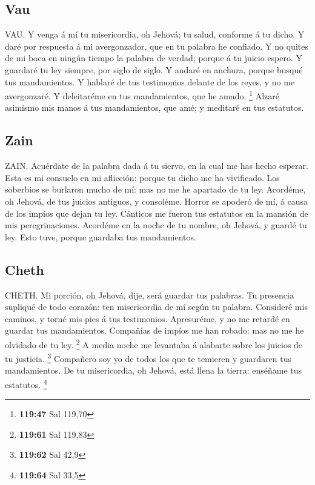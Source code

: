 \hypertarget{vau}{%
\subsection{Vau}\label{vau}}

 VAU. Y venga á mí tu misericordia, oh Jehová; tu salud,
conforme á tu dicho.  Y daré por respuesta á mi
avergonzador, que en tu palabra he confiado.  Y no quites
de mi boca en ningún tiempo la palabra de verdad; porque á tu juicio
espero.  Y guardaré tu ley siempre, por siglo de siglo.
 Y andaré en anchura, porque busqué tus mandamientos.
 Y hablaré de tus testimonios delante de los reyes, y no me
avergonzaré.  Y deleitaréme en tus mandamientos, que he
amado. \footnote{\textbf{119:47} Sal 119,70}  Alzaré
asimismo mis manos á tus mandamientos, que amé; y meditaré en tus
estatutos.

\hypertarget{zain}{%
\subsection{Zain}\label{zain}}

 ZAIN. Acuérdate de la palabra dada á tu siervo, en la cual
me has hecho esperar.  Esta es mi consuelo en mi aflicción:
porque tu dicho me ha vivificado.  Los soberbios se
burlaron mucho de mí: mas no me he apartado de tu ley. 
Acordéme, oh Jehová, de tus juicios antiguos, y consoléme. 
Horror se apoderó de mí, á causa de los impíos que dejan tu ley.
 Cánticos me fueron tus estatutos en la mansión de mis
peregrinaciones.  Acordéme en la noche de tu nombre, oh
Jehová, y guardé tu ley.  Esto tuve, porque guardaba tus
mandamientos.

\hypertarget{cheth}{%
\subsection{Cheth}\label{cheth}}

 CHETH. Mi porción, oh Jehová, dije, será guardar tus
palabras.  Tu presencia supliqué de todo corazón: ten
misericordia de mí según tu palabra.  Consideré mis
caminos, y torné mis pies á tus testimonios.  Apresuréme, y
no me retardé en guardar tus mandamientos.  Compañías de
impíos me han robado: mas no me he olvidado de tu ley. \footnote{\textbf{119:61}
  Sal 119,83}  A media noche me levantaba á alabarte sobre
los juicios de tu justicia. \footnote{\textbf{119:62} Sal 42,9}
 Compañero soy yo de todos los que te temieren y guardaren
tus mandamientos.  De tu misericordia, oh Jehová, está
llena la tierra: enséñame tus estatutos. \footnote{\textbf{119:64} Sal
  33,5}

